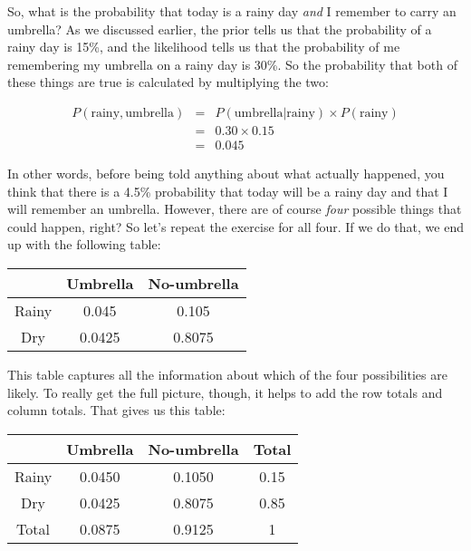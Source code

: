 \noindent
So, what is the probability that today is a rainy day {\it and} I remember to carry an umbrella? As we discussed earlier, the prior tells us that the probability of a rainy day is 15\%, and the likelihood tells us that the probability of me remembering my umbrella on a rainy day is 30\%. So the probability that both of these things are true is calculated by multiplying the two:

\begin{eqnarray*}
P(\mbox{rainy}, \mbox{umbrella}) & = & P(\mbox{umbrella} | \mbox{rainy}) \times P(\mbox{rainy}) \\
& = & 0.30 \times 0.15 \\
& = & 0.045
\end{eqnarray*}

\noindent
In other words, before being told anything about what actually happened, you think that there is a 4.5\% probability that today will be a rainy day and that I will remember an umbrella. However, there are of course {\it four} possible things that could happen, right? So let's repeat the exercise for all four. If we do that, we end up with the following table:

\begin{center}
\begin{tabular}{c|cc}
& Umbrella & No-umbrella \\ \hline
Rainy & 0.045 & 0.105 \\
Dry & 0.0425 & 0.8075
\end{tabular}
\end{center}

\noindent
This table captures all the information about which of the four possibilities are likely. To really get the full picture, though, it helps to add the row totals and column totals. That gives us this table:

\begin{center}
\begin{tabular}{c|cc|c}
& Umbrella & No-umbrella & Total \\ \hline
Rainy & 0.0450 & 0.1050 & 0.15 \\
Dry & 0.0425 & 0.8075  & 0.85 \\ \hline
Total & 0.0875 & 0.9125 & 1
\end{tabular}
\end{center}


